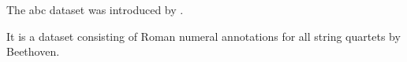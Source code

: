 
The \gls{abc} dataset was introduced by
\textcite{neuwirth2018annotated}.

It is a dataset consisting of Roman numeral annotations for
all string quartets by Beethoven.

